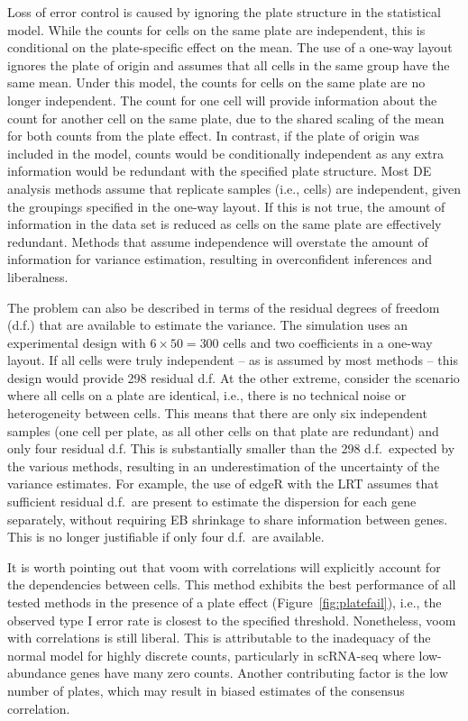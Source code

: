 \documentclass{article}
\begin{document}
Loss of error control is caused by ignoring the plate structure in the statistical model.
While the counts for cells on the same plate are independent, this is conditional on the plate-specific effect on the mean.
The use of a one-way layout ignores the plate of origin and assumes that all cells in the same group have the same mean.
Under this model, the counts for cells on the same plate are no longer independent.
The count for one cell will provide information about the count for another cell on the same plate,
    due to the shared scaling of the mean for both counts from the plate effect.
In contrast, if the plate of origin was included in the model, counts would be conditionally independent as any extra information would be redundant with the specified plate structure.
Most DE analysis methods assume that replicate samples (i.e., cells) are independent, given the groupings specified in the one-way layout.
If this is not true, the amount of information in the data set is reduced as cells on the same plate are effectively redundant.
Methods that assume independence will overstate the amount of information for variance estimation, resulting in overconfident inferences and liberalness.

The problem can also be described in terms of the residual degrees of freedom (d.f.) that are available to estimate the variance.
The simulation uses an experimental design with $6 \times 50 =  300$ cells and two coefficients in a one-way layout.
If all cells were truly independent -- as is assumed by most methods -- this design would provide 298 residual d.f. 
At the other extreme, consider the scenario where all cells on a plate are identical, i.e., there is no technical noise or heterogeneity between cells.
This means that there are only six independent samples (one cell per plate, as all other cells on that plate are redundant) and only four residual d.f.
This is substantially smaller than the 298 d.f.\ expected by the various methods, resulting in an underestimation of the uncertainty of the variance estimates.
For example, the use of edgeR with the LRT assumes that sufficient residual d.f.\ are present to estimate the dispersion for each gene separately,
    without requiring EB shrinkage to share information between genes.
This is no longer justifiable if only four d.f.\ are available.

It is worth pointing out that voom with correlations will explicitly account for the dependencies between cells.
This method exhibits the best performance of all tested methods in the presence of a plate effect (Figure~\ref{fig:platefail}),
    i.e., the observed type I error rate is closest to the specified threshold.
Nonetheless, voom with correlations is still liberal.
This is attributable to the inadequacy of the normal model for highly discrete counts, particularly in scRNA-seq where low-abundance genes have many zero counts.
Another contributing factor is the low number of plates, which may result in biased estimates of the consensus correlation.
\end{document}
